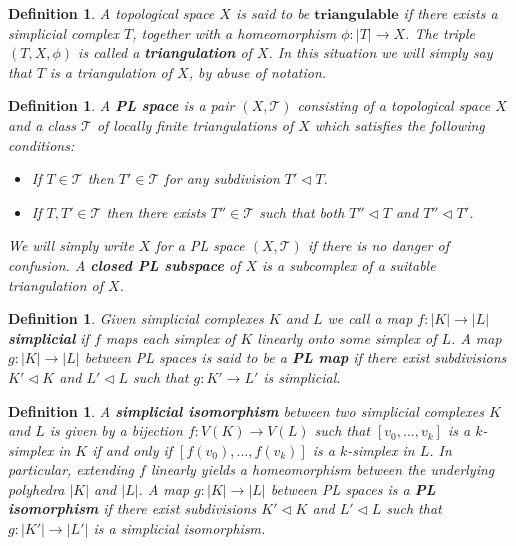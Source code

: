 \documentclass{scrreprt}
\newtheorem{definition}[prop]{Definition}
\begin{document}
\begin{definition}
A topological space $X$ is said to be $\mathbf{triangulable}$ if there exists a simplicial complex $T$, together with a homeomorphism $\phi : |T| \to X$. The triple $(T,X, \phi)$ is called a \textbf{triangulation} of $X$. In this situation we will simply say that $T$ is a triangulation of $X$, by abuse of notation.
\end{definition}


\begin{definition}
A \textbf{PL space} is a pair $(X,\mathcal{T})$ consisting of a topological space $X$ and a class $\mathcal{T}$ of locally finite triangulations of $X$ which satisfies the following conditions:
\begin{itemize}
\item If $T \in \mathcal{T}$ then $T' \in \mathcal{T}$ for any subdivision $T' \lhd T$.
\item If $T,T' \in \mathcal{T}$ then there exists $T'' \in \mathcal{T}$ such that both $T'' \lhd T$ and $T'' \lhd T'$.
\end{itemize}
We will simply write $X$ for a PL space $(X,\mathcal{T})$ if there is no danger of confusion. A \textbf{closed PL subspace} of $X$ is a subcomplex of a suitable triangulation of $X$.
\end{definition}

\begin{definition}
Given simplicial complexes $K$ and $L$ we call a map $f: |K| \to |L|$ \textbf{simplicial} if $f$ maps each simplex of $K$ linearly onto some simplex of $L$. A map \\ $g: |K| \to |L|$ between PL spaces  is said to be a \textbf{PL map} if there exist subdivisions $K' \lhd K$ and $L' \lhd L$ such that $g: K' \to L' $ is simplicial.
\end{definition}

\begin{definition}
A \textbf{simplicial isomorphism} between two simplicial complexes $K$ and $L$ is given by a bijection $f : V(K) \to V(L)$ such that $[v_0,...,v_k]$ is a $k$-simplex in $K$ if and only if $[f(v_0),...,f(v_k)]$ is a $k$-simplex in $L$. In particular, extending $f$ linearly yields a homeomorphism between the underlying polyhedra $|K|$ and $|L|$. A map $g: |K| \to |L|$ between PL spaces is a \textbf{PL isomorphism} if there exist subdivisions $K' \lhd K$ and $L' \lhd L$ such that $g: |K'| \to |L'|$ is a simplicial isomorphism.
\end{definition}
\end{document}
